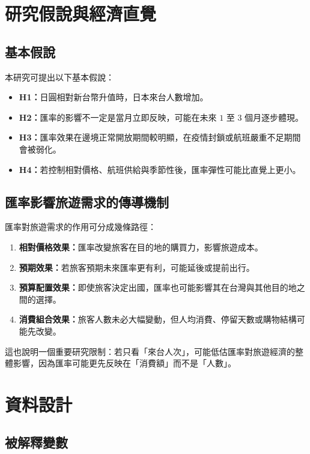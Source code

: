 \documentclass[12pt,a4paper,fontset=none]{ctexart}
\begin{document}
\section{研究假說與經濟直覺}

\subsection{基本假說}

本研究可提出以下基本假說：

\begin{itemize}
  \item \textbf{H1：}日圓相對新台幣升值時，日本來台人數增加。
  \item \textbf{H2：}匯率的影響不一定是當月立即反映，可能在未來 $1$ 至 $3$ 個月逐步體現。
  \item \textbf{H3：}匯率效果在邊境正常開放期間較明顯，在疫情封鎖或航班嚴重不足期間會被弱化。
  \item \textbf{H4：}若控制相對價格、航班供給與季節性後，匯率彈性可能比直覺上更小。
\end{itemize}

\subsection{匯率影響旅遊需求的傳導機制}

匯率對旅遊需求的作用可分成幾條路徑：

\begin{enumerate}
  \item \textbf{相對價格效果：}匯率改變旅客在目的地的購買力，影響旅遊成本。
  \item \textbf{預期效果：}若旅客預期未來匯率更有利，可能延後或提前出行。
  \item \textbf{預算配置效果：}即使旅客決定出國，匯率也可能影響其在台灣與其他目的地之間的選擇。
  \item \textbf{消費組合效果：}旅客人數未必大幅變動，但人均消費、停留天數或購物結構可能先改變。
\end{enumerate}

這也說明一個重要研究限制：若只看「來台人次」，可能低估匯率對旅遊經濟的整體影響，因為匯率可能更先反映在「消費額」而不是「人數」。

\section{資料設計}

\subsection{被解釋變數}
\end{document}

